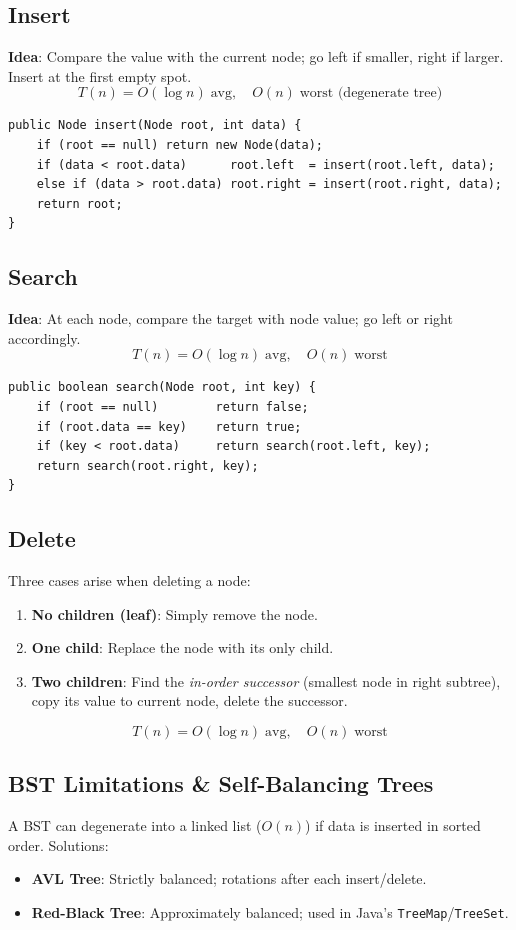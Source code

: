 \documentclass[12pt,a4paper]{article}
\begin{document}
\subsection{Insert}
\textbf{Idea}: Compare the value with the current node; go left if smaller, right if larger. Insert at the first empty spot.
\[
T(n) = O(\log n)\;\text{avg},\quad O(n)\;\text{worst (degenerate tree)}
\]

\begin{lstlisting}[style=javastyle, caption={BST Insert — Java}]
public Node insert(Node root, int data) {
    if (root == null) return new Node(data);
    if (data < root.data)      root.left  = insert(root.left, data);
    else if (data > root.data) root.right = insert(root.right, data);
    return root;
}
\end{lstlisting}

\subsection{Search}
\textbf{Idea}: At each node, compare the target with node value; go left or right accordingly.
\[
T(n) = O(\log n)\;\text{avg},\quad O(n)\;\text{worst}
\]

\begin{lstlisting}[style=javastyle, caption={BST Search — Java}]
public boolean search(Node root, int key) {
    if (root == null)        return false;
    if (root.data == key)    return true;
    if (key < root.data)     return search(root.left, key);
    return search(root.right, key);
}
\end{lstlisting}

\subsection{Delete}
Three cases arise when deleting a node:
\begin{enumerate}
    \item \textbf{No children (leaf)}: Simply remove the node.
    \item \textbf{One child}: Replace the node with its only child.
    \item \textbf{Two children}: Find the \textit{in-order successor} (smallest node in right subtree), copy its value to current node, delete the successor.
\end{enumerate}

\[
T(n) = O(\log n)\;\text{avg},\quad O(n)\;\text{worst}
\]

\subsection{BST Limitations \& Self-Balancing Trees}
A BST can degenerate into a linked list ($O(n)$) if data is inserted in sorted order. Solutions:
\begin{itemize}
    \item \textbf{AVL Tree}: Strictly balanced; rotations after each insert/delete.
    \item \textbf{Red-Black Tree}: Approximately balanced; used in Java's \texttt{TreeMap}/\texttt{TreeSet}.
\end{itemize}
\end{document}
